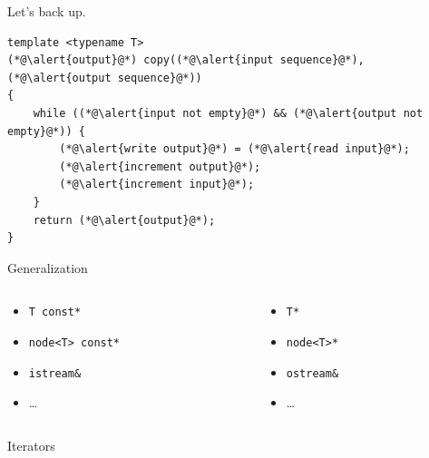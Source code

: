 \documentclass[aspectratio=169]{beamer}
\begin{document}


\begin{frame}[fragile]{Let's back up.}
  \pause{}
\begin{lstlisting}
template <typename T>
(*@\alert{output}@*) copy((*@\alert{input sequence}@*), (*@\alert{output sequence}@*))
{
    while ((*@\alert{input not empty}@*) && (*@\alert{output not empty}@*)) {
        (*@\alert{write output}@*) = (*@\alert{read input}@*);
        (*@\alert{increment output}@*);
        (*@\alert{increment input}@*);
    }
    return (*@\alert{output}@*);
}
\end{lstlisting}
\end{frame}


\begin{frame}{Generalization}
  \begin{columns}
    \begin{column}{0.5\textwidth}
      \begin{itemize}
      \item \lstinline|T const*|
      \item \lstinline|node<T> const*|
      \item \lstinline|istream&|
      \item \dots
      \end{itemize}
    \end{column}
    \pause{}
    \begin{column}{0.5\textwidth}
      \begin{itemize}
      \item \lstinline|T*|
      \item \lstinline|node<T>*|
      \item \lstinline|ostream&|
      \item \dots
      \end{itemize}
    \end{column}
  \end{columns}
  \pause{}

  \begin{center}
    \Huge \alert{Iterators}
  \end{center}
\end{frame}
\end{document}
